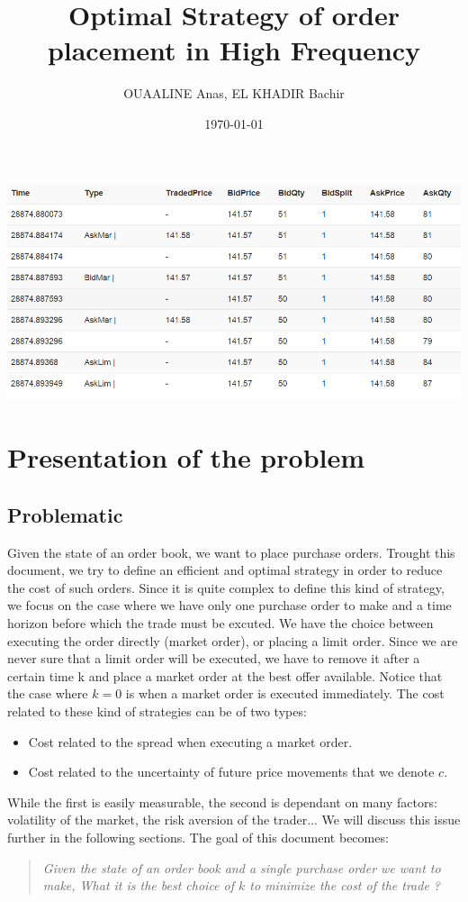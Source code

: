 \documentclass{article}
\title{Optimal Strategy of order placement in High Frequency  }
\author{OUAALINE Anas, EL KHADIR Bachir}
\date \today
\begin{document}
\maketitle

\includegraphics[scale=0.75]{img/donnees.png}

\tableofcontents

\section{Presentation of the problem}

\subsection{Problematic}
Given the state of an order book, we want to place purchase orders. Trought this document, we try to define an efficient and optimal strategy in order to reduce the cost of such orders. Since it is quite complex to define this kind of strategy, we focus on the case where we have only one purchase order to make and a time horizon before which the trade must be excuted. We have the choice between executing the order directly (market order), or placing a limit order. Since we are never sure that a limit order will be executed, we have to remove it after a certain time k and place a market order at the best offer available. Notice that the case where $k = 0$ is when a market order is executed immediately.
The cost related to these kind of strategies can be of two types:

\begin{itemize}
	\item Cost related to the spread when executing a market order.
	\item Cost related to the uncertainty of future price movements that we denote $c$.
\end{itemize}
While the first is easily measurable, the second is dependant on many factors: volatility of the market, the risk aversion of the trader... 
We will discuss this issue further in the following sections.
The goal of this document becomes:
\begin{quote}
\textit{Given the state of an order book and a single purchase order we want to make, What it is the best choice of $k$ to minimize the cost of the trade  ?}
\end{quote}
\end{document}
